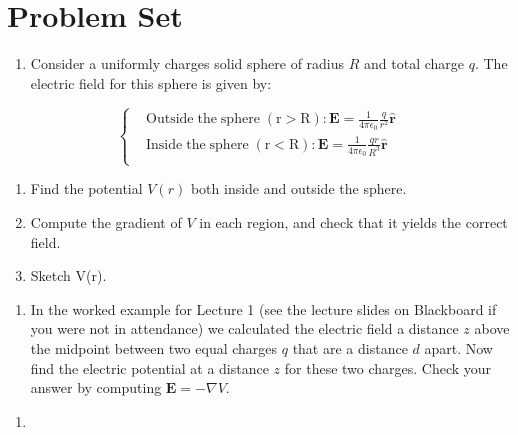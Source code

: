 \documentclass[
  letterpaper,
  DIV=11,
  numbers=noendperiod]{scrreprt}
\providecommand{\tightlist}{%
  \setlength{\itemsep}{0pt}\setlength{\parskip}{0pt}}\usepackage{longtable,booktabs,array}
\begin{document}
\section{Problem Set}\label{problem-set-1}

\begin{enumerate}
\def\labelenumi{\arabic{enumi})}
\tightlist
\item
  Consider a uniformly charges solid sphere of radius \(R\) and total
  charge \(q\). The electric field for this sphere is given by:
\end{enumerate}

\[
\left\{
    \begin{aligned}
         & \mathrm{Outside \; the \; sphere \; (r > R):} \mathrm{\mathbf{E}}= \frac{1}{4\pi\epsilon_0} \frac{q}{r^2} \hat{\mathrm{\mathbf{r}}}  \\
         & \mathrm{Inside \; the \; sphere \; (r < R):}  \mathrm{\mathbf{E}}= \frac{1}{4\pi\epsilon_0} \frac{qr}{R^3} \hat{\mathrm{\mathbf{r}}} \\
    \end{aligned}
\right.
\]

\begin{enumerate}
\def\labelenumi{(\alph{enumi})}
\tightlist
\item
  Find the potential \(V(r)\) both inside and outside the sphere.
\item
  Compute the gradient of \(V\) in each region, and check that it yields
  the correct field.
\item
  Sketch V(r).
\end{enumerate}

\begin{enumerate}
\def\labelenumi{\arabic{enumi})}
\setcounter{enumi}{1}
\tightlist
\item
  In the worked example for Lecture 1 (see the lecture slides on
  Blackboard if you were not in attendance) we calculated the electric
  field a distance \(z\) above the midpoint between two equal charges
  \(q\) that are a distance \(d\) apart. Now find the electric potential
  at a distance \(z\) for these two charges. Check your answer by
  computing \(\mathrm{\mathbf{E}}= -\nabla V\).
\end{enumerate}

\begin{enumerate}
\def\labelenumi{\arabic{enumi})}
\setcounter{enumi}{2}
\tightlist
\item
\end{enumerate}
\end{document}
